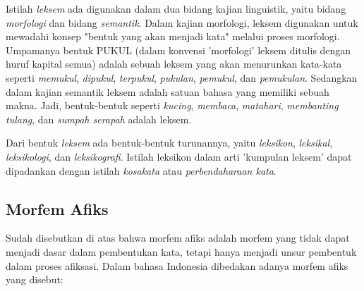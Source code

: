 Istilah \textit{leksem} ada digunakan dalam dua bidang kajian linguistik, yaitu bidang \textit{morfologi} dan bidang \textit{semantik}. Dalam kajian morfologi, leksem digunakan untuk mewadahi konsep "bentuk yang akan menjadi kata" melalui proses morfologi. Umpamanya bentuk PUKUL (dalam konvensi 'morfologi' leksem ditulis dengan huruf kapital semua) adalah sebuah leksem yang akan menurunkan kata-kata seperti \textit{memukul}, \textit{dipukul}, \textit{terpukul}, \textit{pukulan}, \textit{pemukul}, dan \textit{pemukulan}. Sedangkan dalam kajian semantik leksem adalah satuan bahasa yang memiliki sebuah makna. Jadi, bentuk-bentuk seperti \textit{kucing}, \textit{membaca}, \textit{matahari}, \textit{membanting tulang}, dan \textit{sumpah serapah} adalah leksem.

Dari bentuk \textit{leksem} ada bentuk-bentuk turunannya, yaitu \textit{leksikon}, \textit{leksikal}, \textit{leksikologi}, dan \textit{leksikografi}. Istilah leksikon dalam arti 'kumpulan leksem' dapat dipadankan dengan istilah \textit{kosakata} atau \textit{perbendaharaan kata}.


\subsection{Morfem Afiks}
\label{sec:morfemAfiks}

Sudah disebutkan di atas bahwa morfem afiks adalah morfem yang tidak dapat menjadi dasar dalam pembentukan kata, tetapi hanya menjadi unsur pembentuk dalam proses afiksasi. Dalam bahasa Indonesia dibedakan adanya morfem afiks yang disebut:

